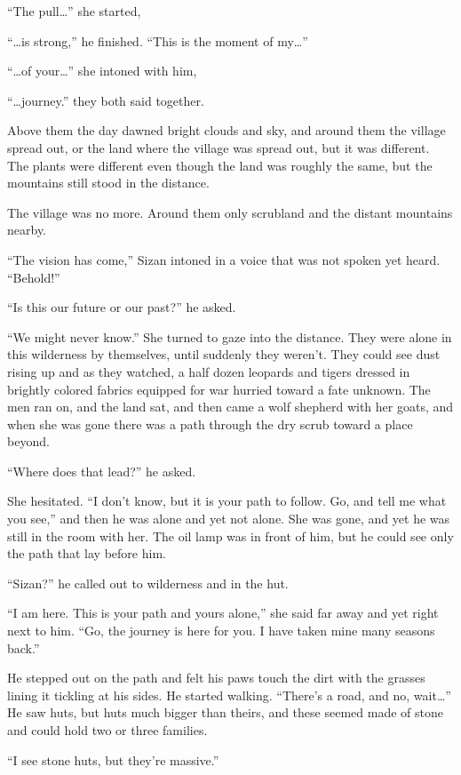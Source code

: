 ``The pull\ldots'' she started,

``\ldots is strong,'' he finished. ``This is the moment of my\ldots''

``\ldots of your\ldots'' she intoned with him,

``\ldots journey.'' they both said together.

Above them the day dawned bright clouds and sky, and around them the village spread out, or the land where the village was spread out, but it was different. The plants were different even though the land was roughly the same, but the mountains still stood in the distance.

The village was no more. Around them only scrubland and the distant mountains nearby.

``The vision has come,'' Sizan intoned in a voice that was not spoken yet heard. ``Behold!''

``Is this our future or our past?'' he asked.

``We might never know.'' She turned to gaze into the distance. They were alone in this wilderness by themselves, until suddenly they weren't. They could see dust rising up and as they watched, a half dozen leopards and tigers dressed in brightly colored fabrics equipped for war hurried toward a fate unknown. The men ran on, and the land sat, and then came a wolf shepherd with her goats, and when she was gone there was a path through the dry scrub toward a place beyond.

``Where does that lead?'' he asked.

She hesitated. ``I don't know, but it is your path to follow. Go, and tell me what you see,'' and then he was alone and yet not alone. She was gone, and yet he was still in the room with her. The oil lamp was in front of him, but he could see only the path that lay before him.

``Sizan?'' he called out to wilderness and in the hut.

``I am here. This is your path and yours alone,'' she said far away and yet right next to him. ``Go, the journey is here for you. I have taken mine many seasons back.''

He stepped out on the path and felt his paws touch the dirt with the grasses lining it tickling at his sides. He started walking. ``There's a road, and no, wait\ldots'' He saw huts, but huts much bigger than theirs, and these seemed made of stone and could hold two or three families.

``I see stone huts, but they're massive.''

